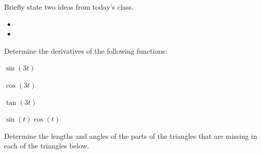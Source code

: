 \postClass

\begin{problem}
\item Briefly state two ideas from today's class.
  \begin{itemize}
  \item 
  \item 
  \end{itemize}
\item 
  \begin{subproblem}
    \item
  \end{subproblem}
\end{problem}


\begin{problem}
\item Determine the derivatives of the following functions:
  \begin{subproblem}
  \item $\sin(3t)$
    \vfill
  \item $\cos(3t)$
    \vfill
  \item $\tan(3t)$
    \vfill
  \item $\sin(t)\cos(t)$
    \vfill
  \end{subproblem}

  \clearpage

\item Determine the lengths and angles of the parts of the triangles
  that are missing in each of the triangles below.

  \scalebox{0.5}{}

  \vfill

\end{problem}


